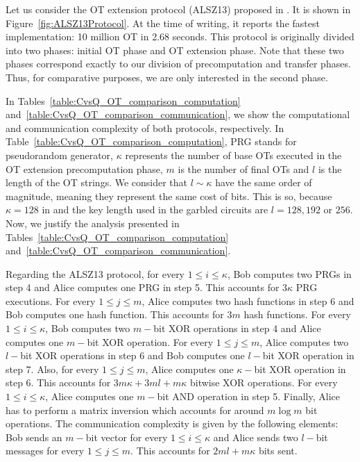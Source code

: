Let us consider the OT extension protocol (ALSZ13) proposed in \cite{ALSZ13}. It is shown in Figure~\ref{fig:ALSZ13Protocol}. At the time of writing, it reports the fastest implementation: 10 million OT in 2.68 seconds. This protocol is originally divided into two phases: initial OT phase and OT extension phase. Note that these two phases correspond exactly to our division of precomputation and transfer phases. Thus, for comparative purposes, we are only interested in the second phase.

In Tables~\ref{table:CvsQ_OT_comparison_computation} and~\ref{table:CvsQ_OT_comparison_communication}, we show the computational and communication complexity of both protocols, respectively. In Table~\ref{table:CvsQ_OT_comparison_computation}, PRG stands for pseudorandom generator, $\kappa$ represents the number of base OTs executed in the OT extension precomputation phase, $m$ is the number of final OTs and $l$ is the length of the OT strings. We consider that $l \sim \kappa$ have the same order of magnitude, meaning they represent the same cost of bits. This is so, because $\kappa = 128$ in \cite{ALSZ13} and the key length used in the garbled circuits are $l = 128, 192$ or $256$. Now, we justify the analysis presented in Tables~\ref{table:CvsQ_OT_comparison_computation} and~\ref{table:CvsQ_OT_comparison_communication}. 

Regarding the ALSZ13 protocol, for every $1\leq i\leq \kappa$, Bob computes two PRGs in step 4 and Alice computes one PRG in step 5. This accounts for $3\kappa$ PRG executions. For every $1\leq j\leq m$, Alice computes two hash functions in step 6 and Bob computes one hash function. This accounts for $3m$ hash functions. For every $1\leq i\leq \kappa$, Bob computes two $m-$bit XOR operations in step 4 and Alice computes one $m-$bit XOR operation. For every $1\leq j\leq m$, Alice computes two $l-$bit XOR operations in step 6 and Bob computes one $l-$bit XOR operation in step 7. Also, for every $1\leq j\leq m$, Alice computes one $\kappa-$bit XOR operation in step 6. This accounts for $3m\kappa + 3ml + m\kappa$ bitwise XOR operations. For every $1\leq i\leq \kappa$, Alice computes one $m-$bit AND operation in step 5. Finally, Alice has to perform a matrix inversion which accounts for around $m\log m$ bit operations. The communication complexity is given by the following elements: Bob sends an $m-$bit vector for every $1\leq i\leq \kappa$ and Alice sends two $l-$bit messages for every $1\leq j\leq m$. This accounts for $2ml + m\kappa$ bits sent.

